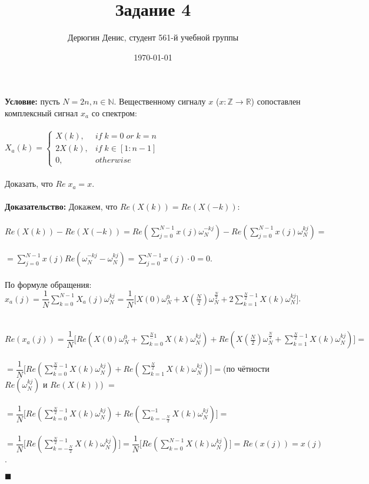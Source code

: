 \documentclass{article}
\title{Задание 4}
\author{
	Дерюгин Денис, студент 561-й учебной группы
}
\date{\today}
\newcommand\proofend{\begin{flushright}$\blacksquare$\end{flushright}}
\begin{document}
\maketitle
\large{
	\textbf{Условие:} пусть $N = 2n, n \in \mathbb{N}$. Вещественному сигналу $x$ ($x: \mathbb{Z} \rightarrow \mathbb{R}$) сопоставлен комплексный сигнал $x_a$ со спектром:\\
	\\

	$X_a(k) = \left\{\begin{matrix}
			X(k), & if\;k = 0\;or\;k = n \\
			2X(k), & if\;k \in \left[1 : n - 1\right]\\
			0, & otherwise
		\end{matrix}\right.$\\
	\\

	Доказать, что $Re\;x_a = x$.\\
	\\
	\textbf{Доказательство:} Докажем, что $Re(X(k)) = Re(X(-k))$:\\ \\

	$Re(X(k)) - Re(X(-k)) = Re(\sum\limits_{j = 0}^{N - 1}x(j)\omega_N^{-kj}) - Re(\sum\limits_{j = 0}^{N - 1}x(j)\omega_N^{kj}) = $\\ \\
	$= \sum\limits_{j = 0}^{N - 1} x(j) Re(\omega_N^{-kj}-\omega_N^{kj}) = \sum\limits_{j = 0}^{N - 1} x(j) \cdot 0 = 0$. \\ \\

	По формуле обращения:\\
	$x_a(j) = \dfrac{1}{N}\sum\limits_{k = 0}^{N - 1} X_a(j) \omega_N^{kj} = \dfrac{1}{N}\Bigg [ X(0)\omega_N^0 + X(\frac{N}{2})\omega_N^{\frac{N}{2}} + 2\sum\limits_{k = 1}^{\frac{N}{2} - 1} X(k) \omega_N^{kj} \Bigg ]$. \\ \\ \\

	$Re(x_a(j)) = \dfrac{1}{N}\Bigg [ Re(X(0)\omega_N^0 + \sum\limits_{k = 0}^{\frac{N} - 1} X(k) \omega_N^{kj}) + Re (X(\frac{N}{2})\omega_N^{\frac{N}{2}} + \sum\limits_{k = 1}^{\frac{N}{2} - 1} X(k) \omega_N^{kj}) \Bigg ] = $ \\ \\
	$= \dfrac{1}{N}\Bigg [ Re(\sum\limits_{k = 0}^{\frac{N}{2} - 1} X(k) \omega_N^{kj}) + Re (\sum\limits_{k = 1}^{\frac{N}{2}} X(k) \omega_N^{kj}) \Bigg ] =$(по чётности $Re(\omega_N^{kj})$ и $Re(X(k))$) $= $\\ \\
	$ = \dfrac{1}{N}\Bigg [ Re(\sum\limits_{k = 0}^{\frac{N}{2} - 1} X(k) \omega_N^{kj}) + Re (\sum\limits_{k = -\frac{N}{2}}^{-1} X(k) \omega_N^{kj}) \Bigg ] = $ \\ \\
	$ = \dfrac{1}{N}\Bigg [ Re(\sum\limits_{k = -\frac{N}{2}}^{\frac{N}{2} - 1} X(k) \omega_N^{kj}) \Bigg ] = \dfrac{1}{N}\Bigg [ Re(\sum\limits_{k = 0}^{N - 1} X(k) \omega_N^{kj}) \Bigg ] = Re(x(j)) = x(j)$.

	\proofend

}
\end{document}
